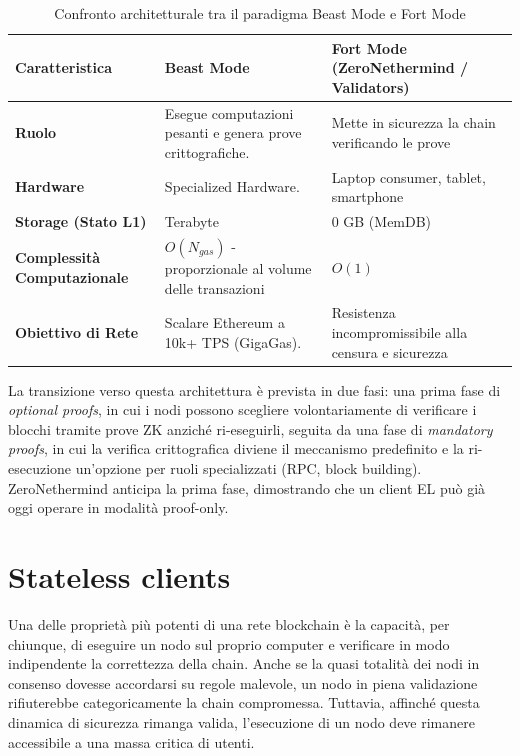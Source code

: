 \documentclass[12pt,a4paper,openright,twoside]{report}
\begin{document}
\vspace{4mm}

\begin{table}[H]
    \centering
    \renewcommand{\arraystretch}{1.4}
    \small
    \begin{tabular}{|p{}|p{}|p{}|}
        \hline
        \textbf{Caratteristica} & \textbf{Beast Mode} & \textbf{Fort Mode} (ZeroNethermind / Validators) \\
        \hline
        \textbf{Ruolo} & Esegue computazioni pesanti e genera prove crittografiche. & Mette in sicurezza la chain verificando le prove \\
        \hline
        \textbf{Hardware} & Specialized Hardware. & Laptop consumer, tablet, smartphone \\
        \hline
        \textbf{Storage (Stato L1)} & Terabyte & 0 GB (MemDB) \\
        \hline
        \textbf{Complessità Computazionale} & $O(N_{gas})$ - proporzionale al volume delle transazioni & $O(1)$ \\
        \hline
        \textbf{Obiettivo di Rete} & Scalare Ethereum a 10k+ TPS (GigaGas). & Resistenza incompromissibile alla censura e sicurezza \\
        \hline
    \end{tabular}
    \caption{Confronto architetturale tra il paradigma Beast Mode e Fort Mode}
    \label{tab:beast_vs_fort}
\end{table}

La transizione verso questa architettura è prevista in due fasi: una prima fase di \textit{optional proofs}\cite{eip8025}, in cui i nodi possono scegliere volontariamente di verificare i blocchi tramite prove ZK anziché ri-eseguirli, seguita da una fase di \textit{mandatory proofs}, in cui la verifica crittografica diviene il meccanismo predefinito e la ri-esecuzione un'opzione per ruoli specializzati (RPC, block building). ZeroNethermind anticipa la prima fase, dimostrando che un client EL può già oggi operare in modalità proof-only.

\section{Stateless clients}

Una delle proprietà più potenti di una rete blockchain è la capacità, per chiunque, di eseguire un nodo sul proprio computer e verificare in modo indipendente la correttezza della chain. Anche se la quasi totalità dei nodi in consenso dovesse accordarsi su regole malevole, un nodo in piena validazione rifiuterebbe categoricamente la chain compromessa. Tuttavia, affinché questa dinamica di sicurezza rimanga valida, l'esecuzione di un nodo deve rimanere accessibile a una massa critica di utenti.
\end{document}
